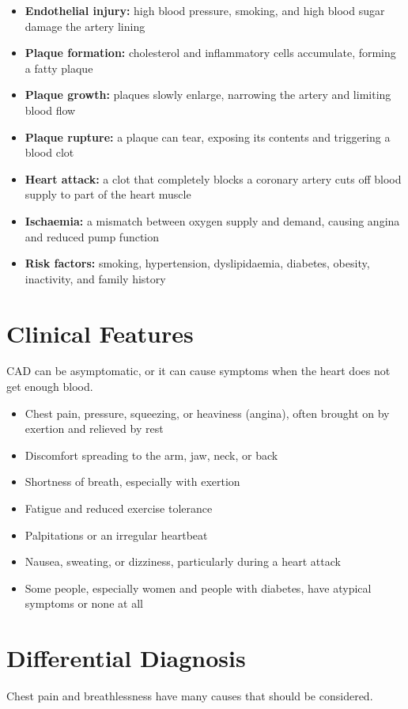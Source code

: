 \begin{itemize}
    \item \textbf{Endothelial injury:} high blood pressure, smoking, and high blood sugar damage the artery lining
    \item \textbf{Plaque formation:} cholesterol and inflammatory cells accumulate, forming a fatty plaque
    \item \textbf{Plaque growth:} plaques slowly enlarge, narrowing the artery and limiting blood flow
    \item \textbf{Plaque rupture:} a plaque can tear, exposing its contents and triggering a blood clot
    \item \textbf{Heart attack:} a clot that completely blocks a coronary artery cuts off blood supply to part of the heart muscle
    \item \textbf{Ischaemia:} a mismatch between oxygen supply and demand, causing angina and reduced pump function
    \item \textbf{Risk factors:} smoking, hypertension, dyslipidaemia, diabetes, obesity, inactivity, and family history
\end{itemize}

\section*{Clinical Features}
CAD can be asymptomatic, or it can cause symptoms when the heart does not get enough blood.

\begin{itemize}
    \item Chest pain, pressure, squeezing, or heaviness (angina), often brought on by exertion and relieved by rest
    \item Discomfort spreading to the arm, jaw, neck, or back
    \item Shortness of breath, especially with exertion
    \item Fatigue and reduced exercise tolerance
    \item Palpitations or an irregular heartbeat
    \item Nausea, sweating, or dizziness, particularly during a heart attack
    \item Some people, especially women and people with diabetes, have atypical symptoms or none at all
\end{itemize}

\section*{Differential Diagnosis}
Chest pain and breathlessness have many causes that should be considered.

